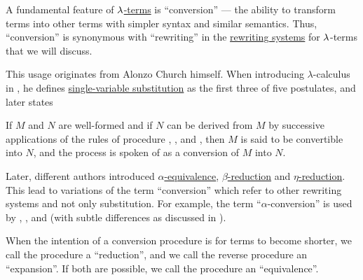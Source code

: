 \begin{concept}\label{con:lambda_conversion}
  A fundamental feature of \hyperref[def:lambda_term]{\( \mathrm{\lambda} \)-terms} is \enquote{conversion} --- the ability to transform terms into other terms with simpler syntax and similar semantics. Thus, \enquote{conversion} is synonymous with \enquote{rewriting} in the \hyperref[def:rewriting_system]{rewriting systems} for \( \mathrm{\lambda} \)-terms that we will discuss.

  This usage originates from Alonzo Church himself. When introducing \( \lambda \)-calculus in \cite[357]{Church1932Untyped}, he defines \hyperref[def:lambda_substitution]{single-variable substitution} as the first three of five postulates, and later states
  \begin{displayquote}
    If \( M \) and \( N \) are well-formed and if \( N \) can be derived from \( M \) by successive applications of the rules of procedure , , and , then \( M \) is said to be convertible into \( N \), and the process is spoken of as a conversion of \( M \) into \( N \).
  \end{displayquote}

  Later, different authors introduced \hyperref[def:lambda_term_alpha_equivalence]{\( \alpha \)-equivalence}, \hyperref[def:beta_eta_reduction]{\( \beta \)-reduction} and \hyperref[def:beta_eta_reduction]{\( \eta \)-reduction}. This lead to variations of the term \enquote{conversion} which refer to other rewriting systems and not only substitution. For example, the term \enquote{\( \alpha \)-conversion} is used by , ,  and  (with subtle differences as discussed in ).

  When the intention of a conversion procedure is for terms to become shorter, we call the procedure a \enquote{reduction}, and we call the reverse procedure an \enquote{expansion}. If both are possible, we call the procedure an \enquote{equivalence}.
\end{concept}

